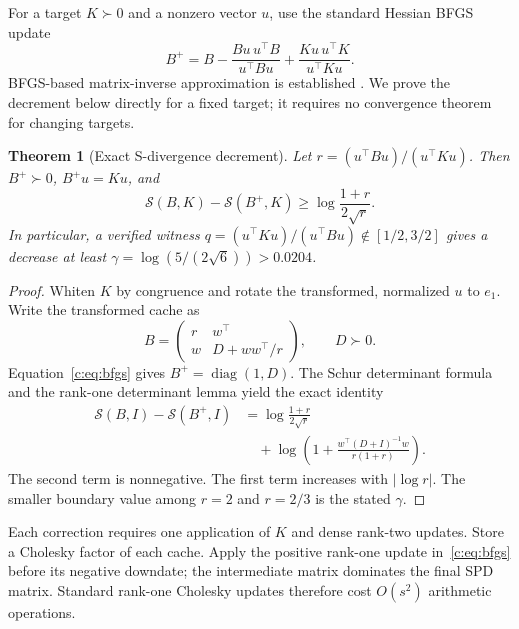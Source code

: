 \documentclass[11pt]{amsart}
\newtheorem{theorem}{Theorem}[section]
\theoremstyle{definition}\newtheorem{definition}[theorem]{Definition}
\theoremstyle{remark}\newtheorem{remark}[theorem]{Remark}
\numberwithin{equation}{section}
\newcommand{\diag}{\operatorname{diag}}
\begin{document}
For a target $K\succ0$ and a nonzero vector $u$, use the standard Hessian
BFGS update
\begin{equation}\label{c:eq:bfgs}
 B^+=B-\frac{Bu\,u^\top B}{u^\top Bu}
          +\frac{Ku\,u^\top K}{u^\top Ku}.
\end{equation}
BFGS-based matrix-inverse approximation is established
\cite{Gower}. We prove the decrement below directly for a fixed target;
it requires no convergence theorem for changing targets.

\begin{theorem}[Exact S-divergence decrement]\label{c:thm:drop}
Let $r=(u^\top Bu)/(u^\top Ku)$. Then $B^+\succ0$, $B^+u=Ku$, and
\begin{equation}\label{c:eq:drop}
 \mathcal{S}(B,K)-\mathcal{S}(B^+,K)
 \ge \log\frac{1+r}{2\sqrt r}.
\end{equation}
In particular, a verified witness
$q=(u^\top Ku)/(u^\top Bu)\notin[1/2,3/2]$
gives a decrease at least
$\gamma=\log(5/(2\sqrt6))>0.0204$.
\end{theorem}
\begin{proof}
Whiten $K$ by congruence and rotate the transformed, normalized $u$ to
$e_1$. Write the transformed cache as
\[
 B=\begin{pmatrix}r&w^\top\\ w&D+ww^\top/r\end{pmatrix},\qquad D\succ0.
\]
Equation~\eqref{c:eq:bfgs} gives $B^+=\diag(1,D)$. The Schur determinant
formula and the rank-one determinant lemma yield the exact identity
\begin{align*}
 \mathcal{S}(B,I)-\mathcal{S}(B^+,I)
 &=\log\frac{1+r}{2\sqrt r}\\
 &\quad+\log\left(1+
       \frac{w^\top(D+I)^{-1}w}{r(1+r)}\right).
\end{align*}
The second term is nonnegative. The first term increases with
$|\log r|$. The smaller boundary value among $r=2$ and $r=2/3$
is the stated $\gamma$.
\end{proof}

Each correction requires one application of $K$ and dense rank-two updates. Store a Cholesky factor of each cache. Apply the
positive rank-one update in~\eqref{c:eq:bfgs} before its negative downdate;
the intermediate matrix dominates the final SPD matrix. Standard rank-one
Cholesky updates therefore cost $O(s^2)$ arithmetic operations.
\end{document}

